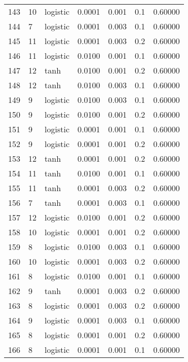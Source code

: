 \begin{tabular}{lllrrrr}
143 &          10 &  logistic &  0.0001 &  0.001 &  0.1 &   0.60000 \\
144 &           7 &  logistic &  0.0001 &  0.003 &  0.1 &   0.60000 \\
145 &          11 &  logistic &  0.0001 &  0.003 &  0.2 &   0.60000 \\
146 &          11 &  logistic &  0.0100 &  0.001 &  0.1 &   0.60000 \\
147 &          12 &      tanh &  0.0100 &  0.001 &  0.2 &   0.60000 \\
148 &          12 &      tanh &  0.0100 &  0.003 &  0.1 &   0.60000 \\
149 &           9 &  logistic &  0.0100 &  0.003 &  0.1 &   0.60000 \\
150 &           9 &  logistic &  0.0100 &  0.001 &  0.2 &   0.60000 \\
151 &           9 &  logistic &  0.0001 &  0.001 &  0.1 &   0.60000 \\
152 &           9 &  logistic &  0.0001 &  0.001 &  0.2 &   0.60000 \\
153 &          12 &      tanh &  0.0001 &  0.001 &  0.2 &   0.60000 \\
154 &          11 &      tanh &  0.0100 &  0.001 &  0.1 &   0.60000 \\
155 &          11 &      tanh &  0.0001 &  0.003 &  0.2 &   0.60000 \\
156 &           7 &      tanh &  0.0001 &  0.003 &  0.1 &   0.60000 \\
157 &          12 &  logistic &  0.0100 &  0.001 &  0.2 &   0.60000 \\
158 &          10 &  logistic &  0.0001 &  0.001 &  0.2 &   0.60000 \\
159 &           8 &  logistic &  0.0100 &  0.003 &  0.1 &   0.60000 \\
160 &          10 &  logistic &  0.0001 &  0.003 &  0.2 &   0.60000 \\
161 &           8 &  logistic &  0.0100 &  0.001 &  0.1 &   0.60000 \\
162 &           9 &      tanh &  0.0001 &  0.003 &  0.2 &   0.60000 \\
163 &           8 &  logistic &  0.0001 &  0.003 &  0.2 &   0.60000 \\
164 &           9 &  logistic &  0.0001 &  0.003 &  0.1 &   0.60000 \\
165 &           8 &  logistic &  0.0001 &  0.001 &  0.2 &   0.60000 \\
166 &           8 &  logistic &  0.0001 &  0.001 &  0.1 &   0.60000 \\

\end{tabular}
